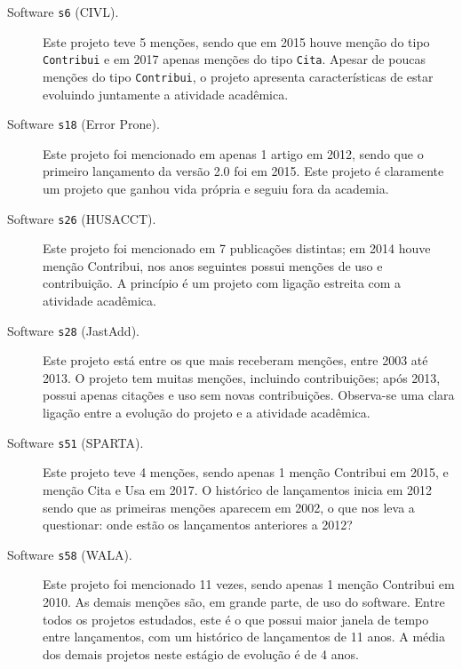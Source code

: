 
\begin{description}

  \item[Software \texttt{s6} (CIVL).]
    Este projeto teve 5 menções, sendo que em 2015 houve menção do tipo \texttt{Contribui} 
    e em 2017 apenas menções do tipo \texttt{Cita}. 
    Apesar de poucas menções do tipo \texttt{Contribui},
    o projeto apresenta características de estar evoluindo juntamente a atividade
    acadêmica.

  \item[Software \texttt{s18} (Error Prone).]
    Este projeto foi mencionado em apenas 1 artigo em 2012, sendo que o
    primeiro lançamento da versão 2.0 foi em 2015. Este projeto é claramente um
    projeto que ganhou vida própria e seguiu fora da academia.

  \item[Software \texttt{s26} (HUSACCT).]
    Este projeto foi mencionado em 7 publicações distintas; em 2014 houve
    menção Contribui, nos anos seguintes possui menções de uso e contribuição.
    A princípio é um projeto com ligação estreita com a atividade acadêmica.

  \item[Software \texttt{s28} (JastAdd).]
    Este projeto está entre os que mais receberam menções, entre 2003 até 2013.
    O projeto tem muitas menções, incluindo contribuições; após 2013, possui apenas
    citações e uso sem novas contribuições. Observa-se uma clara ligação
    entre a evolução do projeto e a atividade acadêmica.

  \item[Software \texttt{s51} (SPARTA).]
    Este projeto teve 4 menções, sendo apenas 1 menção Contribui em 2015,
    e menção Cita e Usa em 2017. O histórico de lançamentos inicia em 2012
    sendo que as primeiras menções aparecem em 2002, o que nos leva a
    questionar: onde estão os lançamentos anteriores a 2012?

  \item[Software \texttt{s58} (WALA).]
    Este projeto foi mencionado 11 vezes, sendo apenas 1 menção Contribui em 2010.
    As demais menções são, em grande parte, de uso do software. 
    Entre todos os projetos estudados, este é o que possui maior janela de tempo entre lançamentos, 
    com um histórico de lançamentos de 11 anos. A média dos demais  projetos neste estágio de evolução
    é de 4 anos.

\end{description}

